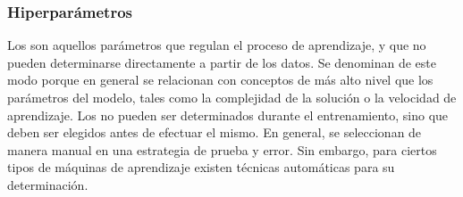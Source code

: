 %
\subsubsection{Hiperparámetros}
%
Los  son aquellos parámetros que regulan el proceso de
aprendizaje, y que no pueden determinarse directamente a partir de
los datos.
Se denominan de este modo porque en general se relacionan
con conceptos de más alto nivel que los parámetros del modelo, tales
como la complejidad de la solución o la velocidad de aprendizaje.
Los  no pueden ser determinados durante el entrenamiento, sino
que deben ser elegidos antes de efectuar el mismo.
En general, se seleccionan de manera manual en una estrategia de
prueba y error.
Sin embargo, para ciertos tipos de máquinas de aprendizaje
existen técnicas automáticas para su determinación.
